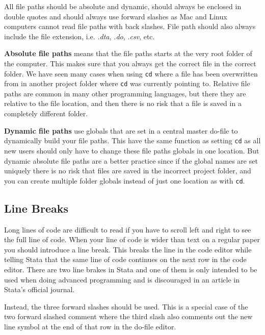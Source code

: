 All file paths should be absolute and dynamic, should always be enclosed in double quotes and should
always use forward slashes as Mac and Linux computers cannot read file paths with back slashes. File path 
should also always include the file extension, i.e. \textit{.dta}, \textit{.do}, \textit{.csv}, etc.

\textbf{Absolute file paths} means that the file paths starts at the very root folder of the computer. This makes sure that
you always get the correct file in the correct folder. We have seen many cases when using \verb|cd| where
a file has been overwritten from in another project folder where \verb|cd| was currently pointing to.
Relative file paths are common in many other programming languages, but there they are relative to the
file location, and then there is no risk that a file is saved in a completely different folder.

\textbf{Dynamic file paths} use globals that are set in a central master do-file to dynamically build your file
paths. This have the same function as setting \verb|cd| as all new users should only have to change these
file paths globals in one location. But dynamic absolute file paths are a better practice since if the
global names are set uniquely there is no risk that files are saved in the incorrect project folder, and
you can create multiple folder globals instead of just one location as with \verb|cd|.


\subsection{Line Breaks}

Long lines of code are difficult to read if you have to scroll left and right to see the full line of code. 
When your line of code is wider than text on a regular paper you should introduce a line break. This breaks 
the line in the code editor while telling Stata that the same line of code continues on the next row in the 
code editor. There are two line brakes in Stata and one of them is only intended to be used when doing 
advanced programming and is discouraged in an article in Stata's official journal.\cite{cox2005styleguide}

Instead, the three forward slashes should be used. This is a special case of the two forward slashed comment 
where the third slash also comments out the new line symbol at the end of that row in the do-file editor.


\mainmatter
